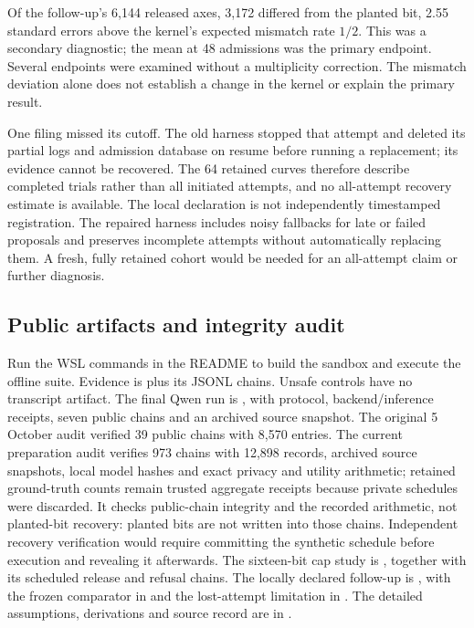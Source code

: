 \documentclass[10pt,twocolumn]{article}
\begin{document}
Of the follow-up's 6{,}144 released axes, 3{,}172 differed from the planted bit, 2.55 standard errors above the kernel's expected mismatch rate $1/2$. This was a secondary diagnostic; the mean at 48 admissions was the primary endpoint. Several endpoints were examined without a multiplicity correction. The mismatch deviation alone does not establish a change in the kernel or explain the primary result.

One filing missed its cutoff. The old harness stopped that attempt and deleted its partial logs and admission database on resume before running a replacement; its evidence cannot be recovered. The 64 retained curves therefore describe completed trials rather than all initiated attempts, and no all-attempt recovery estimate is available. The local declaration is not independently timestamped registration. The repaired harness includes noisy fallbacks for late or failed proposals and preserves incomplete attempts without automatically replacing them. A fresh, fully retained cohort would be needed for an all-attempt claim or further diagnosis.

\subsection*{Public artifacts and integrity audit}

Run the WSL commands in the README to build the sandbox and execute the offline suite. Evidence is  plus its JSONL chains. Unsafe controls have no transcript artifact. The final Qwen run is , with protocol, backend/inference receipts, seven public chains and an archived source snapshot. The original 5 October audit verified 39 public chains with 8{,}570 entries. The current preparation audit verifies 973 chains with 12{,}898 records, archived source snapshots, local model hashes and exact privacy and utility arithmetic; retained ground-truth counts remain trusted aggregate receipts because private schedules were discarded. It checks public-chain integrity and the recorded arithmetic, not planted-bit recovery: planted bits are not written into those chains. Independent recovery verification would require committing the synthetic schedule before execution and revealing it afterwards. The sixteen-bit cap study is , together with its scheduled release and refusal chains. The locally declared follow-up is , with the frozen comparator in  and the lost-attempt limitation in . The detailed assumptions, derivations and source record are in .
\end{document}
